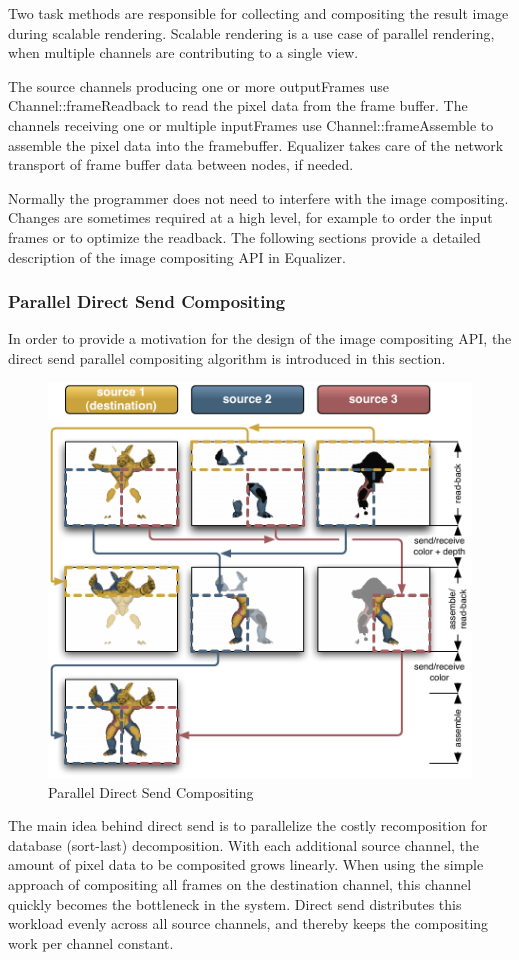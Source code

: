 \documentclass[10pt,a4]{scrartcl}
\begin{document}
Two task methods are responsible for collecting and compositing the
result image during scalable rendering. Scalable rendering is a use case
of parallel rendering, when multiple channels are contributing to a single
view. 

The source channels producing one or more \textsf{outputFrame}s use
\textsf{Channel::frame\-Read\-back} to read the pixel data from the frame
buffer. The channels receiving one or multiple \textsf{inputFrame}s use
\textsf{Channel::frameAssemb\-le} to assemble the pixel data into the
framebuffer. Equalizer takes care of the network transport of frame
buffer data between nodes, if needed.

Normally the programmer does not need to interfere with the image
compositing. Changes are sometimes required at a high level, for example
to order the input frames or to optimize the readback. The following
sections provide a detailed description of the image compositing API in
Equalizer.

\subsubsection{Parallel Direct Send Compositing}

In order to provide a motivation for the design of the image compositing
API, the direct send parallel compositing algorithm is introduced in this
section.

\begin{figure}
  \includegraphics[width=.618\textwidth]{images/directSend.pdf}
  {\caption{\small\label{fDirectSend}Parallel Direct Send Compositing}}
\end{figure}
The main idea behind direct send is to parallelize the costly
recomposition for database (sort-last) decomposition. With each
additional source channel, the amount of pixel data to be composited
grows linearly. When using the simple approach of compositing all frames
on the destination channel, this channel quickly becomes the bottleneck
in the system. Direct send distributes this workload evenly across all
source channels, and thereby keeps the compositing work per channel
constant.
\end{document}
